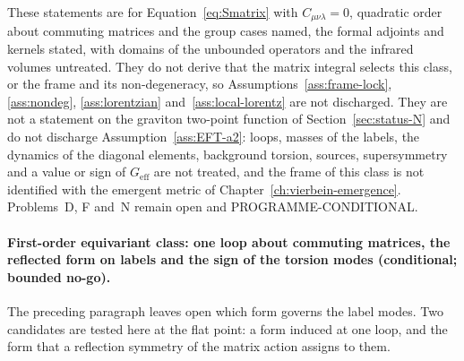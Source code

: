 These statements are for Equation~\eqref{eq:Smatrix} with \(C_{\mu\nu\lambda}=0\), quadratic order about commuting matrices and the group cases named, the formal adjoints and kernels stated, with domains of the unbounded operators and the infrared volumes untreated. They do not derive that the matrix integral selects this class, or the frame and its non-degeneracy, so Assumptions~\ref{ass:frame-lock}, \ref{ass:nondeg}, \ref{ass:lorentzian} and~\ref{ass:local-lorentz} are not discharged. They are not a statement on the graviton two-point function of Section~\ref{sec:status-N} and do not discharge Assumption~\ref{ass:EFT-a2}: loops, masses of the labels, the dynamics of the diagonal elements, background torsion, sources, supersymmetry and a value or sign of \(G_{\mathrm{eff}}\) are not treated, and the frame of this class is not identified with the emergent metric of Chapter~\ref{ch:vierbein-emergence}. Problems~D, F and~N remain open and PROGRAMME-CONDITIONAL.

\paragraph{First-order equivariant class: one loop about commuting matrices, the reflected form on labels and the sign of the torsion modes (conditional; bounded no-go).}
The preceding paragraph leaves open which form governs the label modes. Two candidates are tested here at the flat point: a form induced at one loop, and the form that a reflection symmetry of the matrix action assigns to them.

